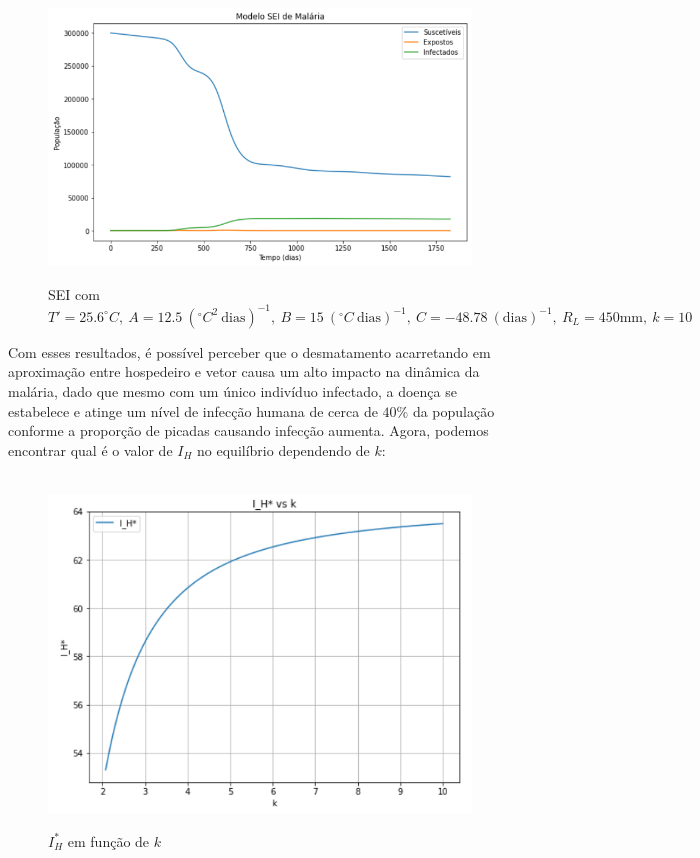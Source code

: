 \documentclass[12pt]{article}
\begin{document}
\begin{figure}[!ht]
        \centering
        \hbox{\hspace{4.2em} \includegraphics[scale=0.6] {Correcao_SEI_Desmat_k=10.png}}
        \caption{SEI com $T'=25.6 ^\circ C, \ A=12.5 \ (^\circ C^2 \ \text{dias})^{-1}, \ B=15 \ (^\circ C \ \text{dias})^{-1}, \ C=-48.78 \ (\text{dias})^{-1}, \ R_L=450 \text{mm}, \ k=10$}
\end{figure} 
\newpage
Com esses resultados, é possível perceber que o desmatamento acarretando em aproximação
entre hospedeiro e vetor causa um alto impacto na dinâmica da malária,
dado que mesmo com um único indivíduo infectado, a doença se estabelece e atinge 
um nível de infecção humana de cerca de $40\%$ da população conforme a 
proporção de picadas causando infecção aumenta. Agora, podemos encontrar qual é o valor de $I_H$
no equilíbrio dependendo de $k$:
\begin{figure}[!ht]
        \centering
        \hbox{\hspace{4.2em} \includegraphics[scale=0.7] {Plot_I_H_vs_k.png}}
        \caption{$I_H^*$ em função de $k$}
\end{figure} 
\end{document}
